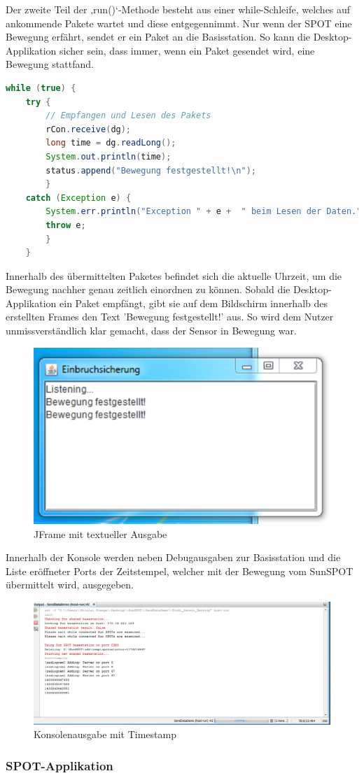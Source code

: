Der zweite Teil der ‚run()‘-Methode besteht aus einer while-Schleife, welches auf ankommende Pakete wartet und diese entgegennimmt. Nur wenn der SPOT eine Bewegung erfährt, sendet er ein Paket an die Basisstation. So kann die Desktop-Applikation sicher sein, dass immer, wenn ein Paket gesendet wird, eine Bewegung stattfand.\\

\begin{lstlisting}[language=Java,caption={Auswerten des empfangenen Paketes},label=lst:rcvpackage,frame=single] 
while (true) {
	try {
		// Empfangen und Lesen des Pakets
		rCon.receive(dg);
		long time = dg.readLong();
		System.out.println(time);
		status.append("Bewegung festgestellt!\n");
		} 
	catch (Exception e) {
		System.err.println("Exception " + e +  " beim Lesen der Daten.");
		throw e;
		}
	}
\end{lstlisting}

Innerhalb des übermittelten Paketes befindet sich die aktuelle Uhrzeit, um die Bewegung nachher genau zeitlich einordnen zu können. Sobald die Desktop-Applikation ein Paket empfängt, gibt sie auf dem Bildschirm innerhalb des erstellten Frames den Text 'Bewegung festgestellt!' aus. So wird dem Nutzer unmissverständlich klar gemacht, dass der Sensor in Bewegung war.

\begin{figure}[H] 
	\centering
	\includegraphics[scale=0.8]{Bilder/bewegung}
	\caption{JFrame mit textueller Ausgabe}
	\label{f:bewegung}
\end{figure}

Innerhalb der Konsole werden neben Debugausgaben zur Basisstation und die Liste eröffneter Ports der Zeitstempel, welcher mit der Bewegung vom SunSPOT übermittelt wird, ausgegeben.

\begin{figure}[H] 
	\centering
	\includegraphics[scale=0.5]{Bilder/timestamp}
	\caption{Konsolenausgabe mit Timestamp}
	\label{f:timestamp}
\end{figure}

\subsubsection{SPOT-Applikation}\label{sss:SPOT-Applikation}
